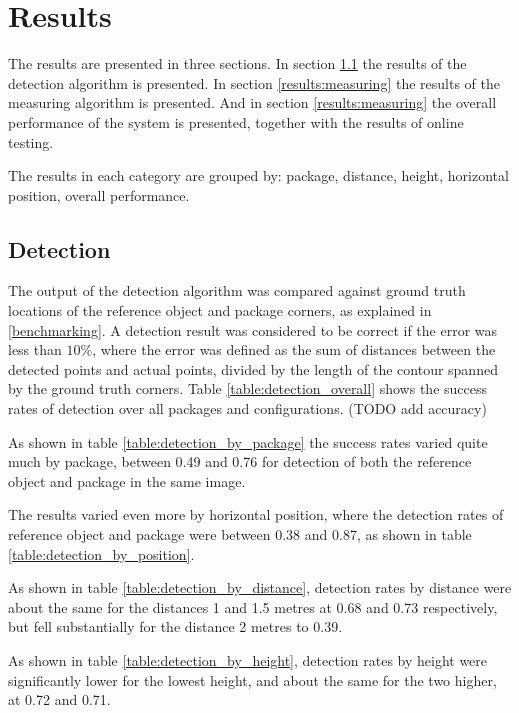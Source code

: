 \chapter{Results} \label{results}
The results are presented in three sections.
In section \ref{results:detection} the results of the detection algorithm is presented.
In section \ref{results:measuring} the results of the measuring algorithm is presented.
And in section \ref{results:measuring} the overall performance of the system is presented,
together with the results of online testing.

The results in each category are grouped by: package, distance, height, horizontal position, overall performance. %

\section{Detection} \label{results:detection}
The output of the detection algorithm was compared against ground truth locations of the reference object and package corners, as explained in \ref{benchmarking}.
A detection result was considered to be correct if the error was less than $10\%$, where the error was defined as the sum of distances between the detected points and actual points, divided by the length of the contour spanned by the ground truth corners. Table \ref{table:detection_overall} shows the success rates of detection over all packages and configurations.
(TODO add accuracy)  %


As shown in table \ref{table:detection_by_package} the success rates varied quite much by package, between 0.49 and 0.76 for detection of both the reference object and package in the same image.


The results varied even more by horizontal position, where the detection rates of reference object and package were between 0.38 and 0.87, as shown in table \ref{table:detection_by_position}.


As shown in table \ref{table:detection_by_distance}, detection rates by distance were about the same for the distances 1 and 1.5 metres at 0.68 and 0.73 respectively, but fell substantially for the distance 2 metres to 0.39.


As shown in table \ref{table:detection_by_height}, detection rates by height were significantly lower for the lowest height, and about the same for the two higher, at 0.72 and 0.71.


